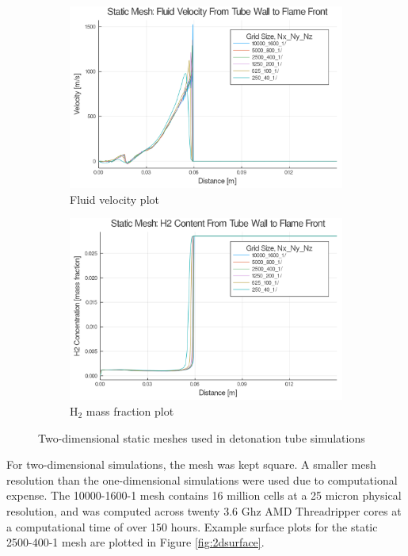 \begin{figure} \ContinuedFloat
    
    \begin{subfigure}[]{0.95\textwidth}
        \centering
        \includegraphics[width=\textwidth]{./figs/static2d/u.png}
        \caption{Fluid velocity plot}
    \end{subfigure}

    \begin{subfigure}[]{0.95\textwidth}
        \centering
        \includegraphics[width=\textwidth]{./figs/static2d/y.png}
        \caption{H\(_2\) mass fraction plot}
    \end{subfigure}

    \caption{Two-dimensional static meshes used in detonation tube simulations}
    \label{fig:2dstatic}
\end{figure}%
For two-dimensional simulations, the mesh was kept square. A smaller mesh resolution than the one-dimensional simulations were used due to computational expense. The 10000-1600-1 mesh contains 16 million cells at a 25 micron physical resolution, and was computed across twenty 3.6 Ghz AMD Threadripper cores at a computational time of over 150 hours. Example surface plots for the static 2500-400-1 mesh are plotted in Figure \ref{fig:2dsurface}. 
